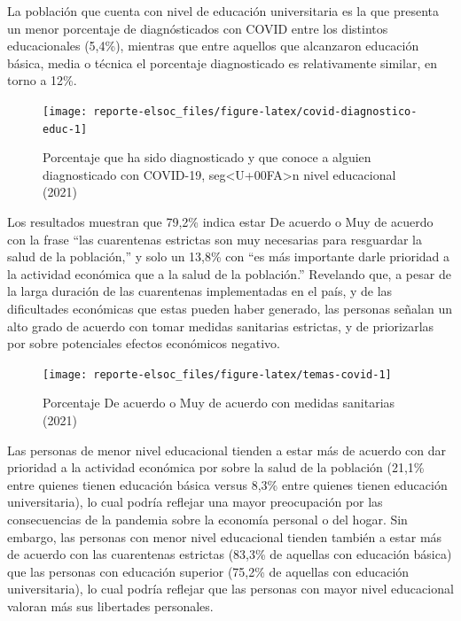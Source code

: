\documentclass[
  12pt,
]{book}
\begin{document}
La población que cuenta con nivel de educación universitaria es la que presenta un menor porcentaje de diagnósticados con COVID entre los distintos educacionales (5,4\%), mientras que entre aquellos que alcanzaron educación básica, media o técnica el porcentaje diagnosticado es relativamente similar, en torno a 12\%.

\begin{figure}

{\centering \texttt{[image: reporte-elsoc\_files/figure-latex/covid-diagnostico-educ-1]} 

}

\caption{Porcentaje que ha sido diagnosticado y que conoce a alguien diagnosticado con COVID-19, seg<U+00FA>n nivel educacional (2021)}\label{fig:covid-diagnostico-educ}
\end{figure}

Los resultados muestran que 79,2\% indica estar De acuerdo o Muy de acuerdo con la frase ``las cuarentenas estrictas son muy necesarias para resguardar la salud de la población,'' y solo un 13,8\% con ``es más importante darle prioridad a la actividad económica que a la salud de la población.'' Revelando que, a pesar de la larga duración de las cuarentenas implementadas en el país, y de las dificultades económicas que estas pueden haber generado, las personas señalan un alto grado de acuerdo con tomar medidas sanitarias estrictas, y de priorizarlas por sobre potenciales efectos económicos negativo.

\begin{figure}

{\centering \texttt{[image: reporte-elsoc\_files/figure-latex/temas-covid-1]} 

}

\caption{Porcentaje De acuerdo o Muy de acuerdo con medidas sanitarias (2021)}\label{fig:temas-covid}
\end{figure}

Las personas de menor nivel educacional tienden a estar más de acuerdo con dar prioridad a la actividad económica por sobre la salud de la población (21,1\% entre quienes tienen educación básica versus 8,3\% entre quienes tienen educación universitaria), lo cual podría reflejar una mayor preocupación por las consecuencias de la pandemia sobre la economía personal o del hogar. Sin embargo, las personas con menor nivel educacional tienden también a estar más de acuerdo con las cuarentenas estrictas (83,3\% de aquellas con educación básica) que las personas con educación superior (75,2\% de aquellas con educación universitaria), lo cual podría reflejar que las personas con mayor nivel educacional valoran más sus libertades personales.
\end{document}
